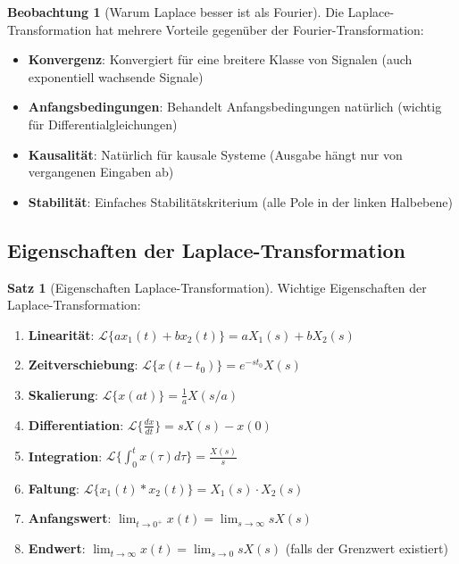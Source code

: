 ﻿\documentclass[a4paper,12pt]{report}
\theoremstyle{definition}
\newtheorem{satz}{Satz}
\newtheorem{beobachtung}{Beobachtung}
\begin{document}
	\begin{beobachtung}[Warum Laplace besser ist als Fourier]
		Die Laplace-Transformation hat mehrere Vorteile gegenüber der Fourier-Transformation:
		\begin{itemize}
			\item[-] \textbf{Konvergenz}: Konvergiert für eine breitere Klasse von Signalen (auch exponentiell wachsende Signale)
			\item[-] \textbf{Anfangsbedingungen}: Behandelt Anfangsbedingungen natürlich (wichtig für Differentialgleichungen)
			\item[-] \textbf{Kausalität}: Natürlich für kausale Systeme (Ausgabe hängt nur von vergangenen Eingaben ab)
			\item[-] \textbf{Stabilität}: Einfaches Stabilitätskriterium (alle Pole in der linken Halbebene)
		\end{itemize}
	\end{beobachtung}
	
	\subsection{Eigenschaften der Laplace-Transformation}
	
	\begin{satz}[Eigenschaften Laplace-Transformation]
		Wichtige Eigenschaften der Laplace-Transformation:
		\begin{enumerate}
			\item[-] \textbf{Linearität}: $\mathcal{L}\{a x_1(t) + b x_2(t)\} = a X_1(s) + b X_2(s)$
			
			\item[-] \textbf{Zeitverschiebung}: $\mathcal{L}\{x(t-t_0)\} = e^{-st_0} X(s)$
			
			\item[-] \textbf{Skalierung}: $\mathcal{L}\{x(at)\} = \frac{1}{a} X(s/a)$
			
			\item[-] \textbf{Differentiation}: $\mathcal{L}\{\frac{dx}{dt}\} = s X(s) - x(0)$
			
			\item[-] \textbf{Integration}: $\mathcal{L}\{\int_0^t x(\tau) d\tau\} = \frac{X(s)}{s}$
			
			\item[-] \textbf{Faltung}: $\mathcal{L}\{x_1(t) * x_2(t)\} = X_1(s) \cdot X_2(s)$
			
			\item[-] \textbf{Anfangswert}: $\lim_{t \to 0^+} x(t) = \lim_{s \to \infty} s X(s)$
			
			\item[-] \textbf{Endwert}: $\lim_{t \to \infty} x(t) = \lim_{s \to 0} s X(s)$ (falls der Grenzwert existiert)
		\end{enumerate}
	\end{satz}
	
\end{document}
